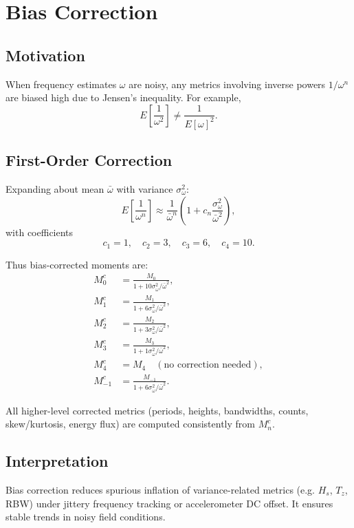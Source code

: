 \documentclass[11pt]{article}
\begin{document}
\section{Bias Correction}

\subsection{Motivation}

When frequency estimates $\omega$ are noisy, any metrics involving inverse powers $1/\omega^n$ are biased high due to Jensen’s inequality.  
For example,
\[
E\!\left[\frac{1}{\omega^2}\right] \neq \frac{1}{E[\omega]^2}.
\]

\subsection{First-Order Correction}

Expanding about mean $\bar{\omega}$ with variance $\sigma_\omega^2$:
\[
E\!\left[\frac{1}{\omega^n}\right] \approx \frac{1}{\bar{\omega}^n}
\left(1 + c_n \frac{\sigma_\omega^2}{\bar{\omega}^2}\right),
\]
with coefficients
\[
c_1 = 1,\quad c_2 = 3,\quad c_3 = 6,\quad c_4 = 10.
\]

Thus bias-corrected moments are:
\begin{align}
M_0^c &= \frac{M_0}{1 + 10 \sigma_\omega^2 / \bar{\omega}^2}, \\
M_1^c &= \frac{M_1}{1 + 6 \sigma_\omega^2 / \bar{\omega}^2}, \\
M_2^c &= \frac{M_2}{1 + 3 \sigma_\omega^2 / \bar{\omega}^2}, \\
M_3^c &= \frac{M_3}{1 + 1 \sigma_\omega^2 / \bar{\omega}^2}, \\
M_4^c &= M_4 \quad (\text{no correction needed}), \\
M_{-1}^c &= \frac{M_{-1}}{1 + 6 \sigma_\omega^2 / \bar{\omega}^2}.
\end{align}

All higher-level corrected metrics (periods, heights, bandwidths, counts, skew/kurtosis, energy flux) are computed consistently from $M_n^c$.

\subsection{Interpretation}

Bias correction reduces spurious inflation of variance-related metrics (e.g. $H_s$, $T_z$, RBW) under jittery frequency tracking or accelerometer DC offset.  
It ensures stable trends in noisy field conditions.
\end{document}
